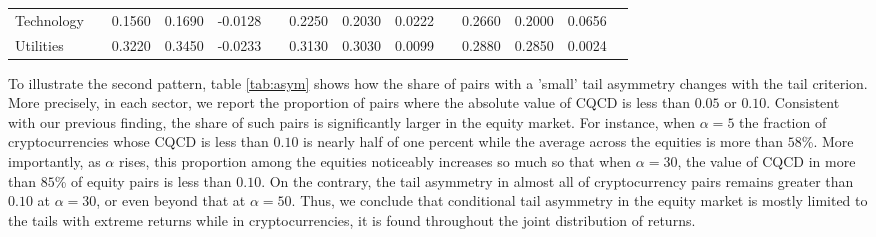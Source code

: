 \documentclass{article}
\begin{document}
\begin{table}[H]
\begin{threeparttable}
\begin{tabular}{lccccccccccccc}
\multicolumn{1}{l}{Technology}     &  & 0.1560 & 0.1690 & -0.0128 & & 0.2250 & 0.2030 & 0.0222 & & 0.2660 & 0.2000 & 0.0656 \\
\multicolumn{1}{l}{Utilities}     &  & 0.3220 & 0.3450 & -0.0233 & & 0.3130 & 0.3030 & 0.0099 & & 0.2880 & 0.2850 & 0.0024 \\
\bottomrule
\end{tabular}
\end{threeparttable}
\end{table}

To illustrate the second pattern, table \ref{tab:asym} shows how the share of pairs with a 'small' tail asymmetry changes with the tail criterion. More precisely, in each sector, we report the proportion of pairs where the absolute value of CQCD is less than $0.05$ or $0.10$. Consistent with our previous finding, the share of such pairs is significantly larger in the equity market. For instance, when $\alpha = 5$ the fraction of cryptocurrencies whose CQCD is less than $0.10$ is nearly half of one percent while the average across the equities is more than $58$\%. More importantly, as $\alpha$ rises, this proportion among the equities noticeably increases so much so that when $\alpha = 30$, the value of CQCD in more than $85$\% of equity pairs is less than $0.10$. On the contrary, the tail asymmetry in almost all of cryptocurrency pairs remains greater than $0.10$ at $\alpha = 30$, or even beyond that at $\alpha = 50$. Thus, we conclude that conditional tail asymmetry in the equity market is mostly limited to the tails with extreme returns while in cryptocurrencies, it is found throughout the joint distribution of returns. 
\end{document}
